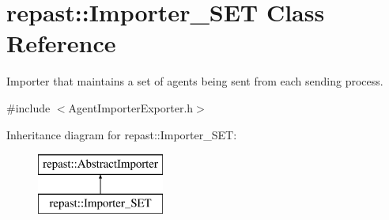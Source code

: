 \hypertarget{classrepast_1_1_importer___s_e_t}{\section{repast\-:\-:Importer\-\_\-\-S\-E\-T Class Reference}
\label{classrepast_1_1_importer___s_e_t}
}


Importer that maintains a set of agents being sent from each sending process.  




{\ttfamily \#include $<$Agent\-Importer\-Exporter.\-h$>$}

Inheritance diagram for repast\-:\-:Importer\-\_\-\-S\-E\-T\-:\begin{figure}[H]
\begin{center}
\leavevmode
\includegraphics[height=2.000000cm]{classrepast_1_1_importer___s_e_t}
\end{center}
\end{figure}
